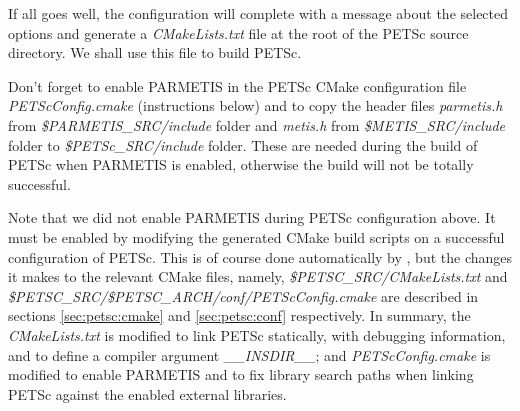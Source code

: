 \documentclass[10pt,a4paper]{article}
\begin{document}
If all goes well, the configuration will complete with a message about the
selected options and generate a \textit{CMakeLists.txt} file at the root of the
PETSc source directory. We shall use this file to build PETSc. 

\begin{parchment}[Note]
Don't forget to enable PARMETIS in the PETSc CMake configuration file
\textit{PETScConfig.cmake} (instructions below) and to copy the header files
\textit{parmetis.h} from \textit{\$PARMETIS\_SRC/include} folder and
\textit{metis.h} from \textit{\$METIS\_SRC/include} folder to
\textit{\$PETSc\_SRC/include} folder. These are needed during the build of PETSc
when PARMETIS is enabled, otherwise the build will not be totally successful.
\end{parchment}


Note that we did not enable PARMETIS during PETSc configuration above. It must
be enabled by modifying the generated CMake build scripts on a successful
configuration of PETSc. This is of course done automatically by
\chastelibbuilder, but the changes it makes to the relevant CMake files, namely,
\textit{\$PETSC\_SRC/CMakeLists.txt} and
\textit{\$PETSC\_SRC/\$PETSC\_ARCH/conf/PETScConfig.cmake} are described in
sections \ref{sec:petsc:cmake} and \ref{sec:petsc:conf} respectively. In
summary, the \textit{CMakeLists.txt} is modified to link PETSc statically, with
debugging information, and to define a compiler argument
\textit{\_\_INSDIR\_\_}; and  \textit{PETScConfig.cmake} is modified to enable
PARMETIS and to fix library search paths when linking PETSc against the enabled
external libraries.   
\end{document}
